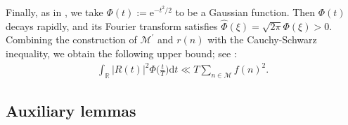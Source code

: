 \documentclass[12pt,reqno]{amsart}
\theoremstyle{definition}
\numberwithin{equation}{section}
\newcommand{\ph}{\Phi}
\newcommand{\mbr}{\mathbb{R}}
\newcommand{\mcm}{\mathcal{M}}
\newcommand{\mmd}{\mathrm{d}}
\newcommand{\mme}{\mathrm{e}}
\newcommand{\whp}{\widehat{\Phi}}
\begin{document}
\par
Finally, as in \cite{bondarenko2017large, bondarenko2018argument}, we take \(\Phi(t) := \mme^{-t^{2}/2}\) to be a Gaussian function. Then \(\ph(t)\) decays rapidly, and its Fourier transform satisfies \(\whp(\xi) = \sqrt{2\pi}\ph(\xi)>0\). Combining the construction of \(\mcm^\prime\) and \(r(n)\) with the Cauchy-Schwarz inequality, we obtain the following upper bound; see \cite[Lemma 5]{bondarenko2018argument}:
\begin{align}
    \label{R2phi-upper}
    \int_{\mbr}|R(t)|^2\Phi \Big( \frac{t}{T} \Big) \mmd t \ll T \sum_{n \in \mcm}f(n)^2.
\end{align}

\subsection{Auxiliary lemmas}
\label{secauxiliary}
\end{document}
